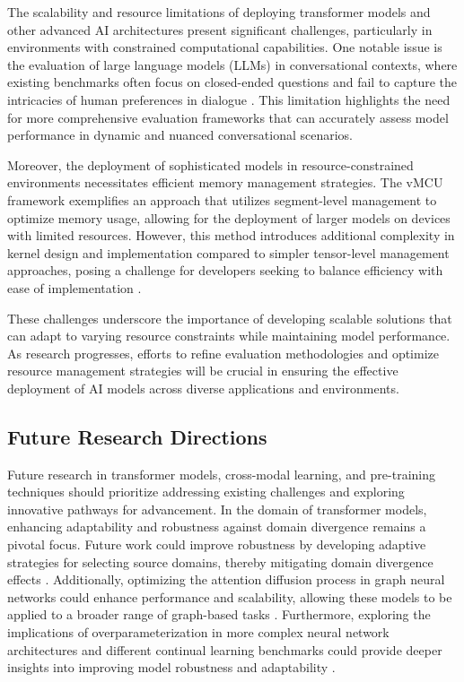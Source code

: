 The scalability and resource limitations of deploying transformer models and other advanced AI architectures present significant challenges, particularly in environments with constrained computational capabilities. One notable issue is the evaluation of large language models (LLMs) in conversational contexts, where existing benchmarks often focus on closed-ended questions and fail to capture the intricacies of human preferences in dialogue \cite{JudgingLLM3}. This limitation highlights the need for more comprehensive evaluation frameworks that can accurately assess model performance in dynamic and nuanced conversational scenarios.



Moreover, the deployment of sophisticated models in resource-constrained environments necessitates efficient memory management strategies. The vMCU framework exemplifies an approach that utilizes segment-level management to optimize memory usage, allowing for the deployment of larger models on devices with limited resources. However, this method introduces additional complexity in kernel design and implementation compared to simpler tensor-level management approaches, posing a challenge for developers seeking to balance efficiency with ease of implementation \cite{zheng2024vmcucoordinatedmemorymanagement}.



These challenges underscore the importance of developing scalable solutions that can adapt to varying resource constraints while maintaining model performance. As research progresses, efforts to refine evaluation methodologies and optimize resource management strategies will be crucial in ensuring the effective deployment of AI models across diverse applications and environments.



\subsection{Future Research Directions} \label{subsec:Future Research Directions}

Future research in transformer models, cross-modal learning, and pre-training techniques should prioritize addressing existing challenges and exploring innovative pathways for advancement. In the domain of transformer models, enhancing adaptability and robustness against domain divergence remains a pivotal focus. Future work could improve robustness by developing adaptive strategies for selecting source domains, thereby mitigating domain divergence effects \cite{wang2023environmenttransformerpolicyoptimization}. Additionally, optimizing the attention diffusion process in graph neural networks could enhance performance and scalability, allowing these models to be applied to a broader range of graph-based tasks \cite{wang2019pairedopenendedtrailblazerpoet}. Furthermore, exploring the implications of overparameterization in more complex neural network architectures and different continual learning benchmarks could provide deeper insights into improving model robustness and adaptability \cite{goldfarb2022analysiscatastrophicforgettingrandom}.




